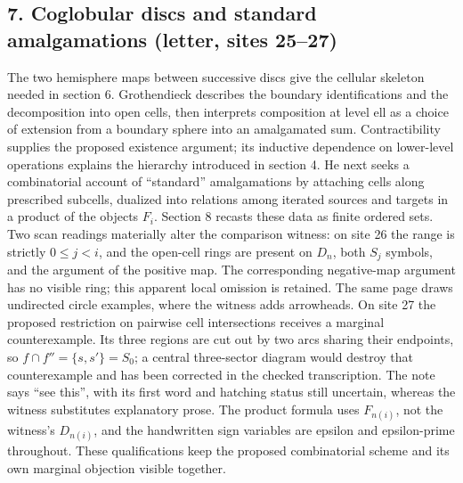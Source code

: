 \subsection*{7. Coglobular discs and standard amalgamations (letter, sites 25--27)}
The two hemisphere maps between successive discs give the cellular skeleton needed in section 6. Grothendieck describes the boundary identifications and the decomposition into open cells, then interprets composition at level ell as a choice of extension from a boundary sphere into an amalgamated sum. Contractibility supplies the proposed existence argument; its inductive dependence on lower-level operations explains the hierarchy introduced in section 4. He next seeks a combinatorial account of ``standard'' amalgamations by attaching cells along prescribed subcells, dualized into relations among iterated sources and targets in a product of the objects $F_i$. Section 8 recasts these data as finite ordered sets. Two scan readings materially alter the comparison witness: on site 26 the range is strictly $0\leq j<i$, and the open-cell rings are present on $D_n$, both $S_j$ symbols, and the argument of the positive map. The corresponding negative-map argument has no visible ring; this apparent local omission is retained. The same page draws undirected circle examples, where the witness adds arrowheads. On site 27 the proposed restriction on pairwise cell intersections receives a marginal counterexample. Its three regions are cut out by two arcs sharing their endpoints, so $f\cap f''=\{s,s'\}=S_0$; a central three-sector diagram would destroy that counterexample and has been corrected in the checked transcription. The note says ``see this'', with its first word and hatching status still uncertain, whereas the witness substitutes explanatory prose. The product formula uses $F_{n(i)}$, not the witness's $D_{n(i)}$, and the handwritten sign variables are epsilon and epsilon-prime throughout. These qualifications keep the proposed combinatorial scheme and its own marginal objection visible together.

